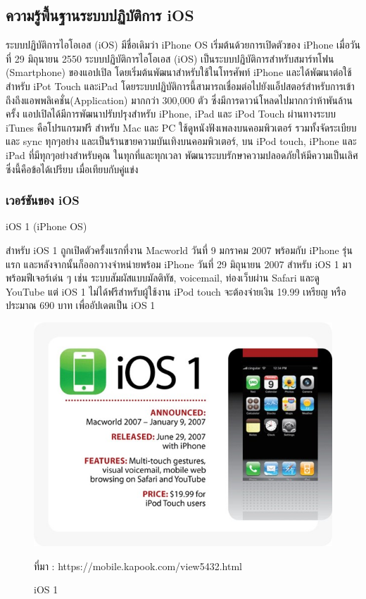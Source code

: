 	\subsection{ความรู้พื้นฐานระบบปฏิบัติการ iOS}
	ระบบปฏิบัติการไอโอเอส (iOS) \cite{iosref} มีชื่อเดิมว่า iPhone OS เริ่มต้นด้วยการเปิดตัวของ iPhone เมื่อวันที่ 29 มิถุนายน 2550 ระบบปฏิบัติการไอโอเอส (iOS) เป็นระบบปฏิบัติการสำหรับสมาร์ทโฟน (Smartphone) ของแอปเปิล โดยเริ่มต้นพัฒนาสำหรับใช้ในโทรศัพท์ iPhone และได้พัฒนาต่อใช้สำหรับ iPot Touch และiPad โดยระบบปฏิบัติการนี้สามารถเชื่อมต่อไปยังแอ็ปสตอร์สำหรับการเข้าถึงถึงแอพพลิเคชั่น(Application) มากกว่า 300,000 ตัว ซึ่งมีการดาวน์โหลดไปมากกว่าห้าพันล้านครั้ง แอปเปิลได้มีการพัฒนาปรับปรุงสำหรับ iPhone, iPad และ iPod Touch ผ่านทางระบบ iTunes คือโปรแกรมฟรี สำหรับ Mac และ PC ใช้ดูหนังฟังเพลงบนคอมพิวเตอร์ รวมทั้งจัดระเบียบและ sync ทุกๆอย่าง และเป็นร้านขายความบันเทิงบนคอมพิวเตอร์, บน iPod touch, iPhone และ iPad ที่มีทุกๆอย่างสำหรับคุณ ในทุกที่และทุกเวลา พัฒนาระบบรักษาความปลอดภัยให้มีความเป็นเลิศ ซึ่งนี้คือข้อได้เปรียบ เมื่อเทียบกับคู่แข่ง	

	\subsubsection{เวอร์ชันของ iOS} 
	iOS 1 (iPhone OS)

	สำหรับ iOS 1 ถูกเปิดตัวครั้งแรกที่งาน Macworld วันที่ 9 มกราคม 2007 พร้อมกับ iPhone รุ่นแรก และหลังจากนั้นก็ออกวางจำหน่ายพร้อม iPhone วันที่ 29 มิถุนายน 2007 สำหรับ iOS 1 มาพร้อมฟีเจอร์เด่น ๆ เช่น ระบบสัมผัสแบบมัลติทัช, voicemail, ท่องเว็บผ่าน Safari และดู YouTube แต่ iOS 1 ไม่ได้ฟรีสำหรับผู้ใช้งาน iPod touch จะต้องจ่ายเงิน 19.99 เหรียญ หรือประมาณ 690 บาท เพื่ออัปเดตเป็น iOS 1

	\begin{figure}[H]
		\centering
		\includegraphics[width=0.8\columnwidth]{Figures/2/iOS/iOS1}
		\caption{iOS 1}{ที่มา : https://mobile.kapook.com/view5432.html}
		\label{Fig:iosversion1}
	\end{figure}


